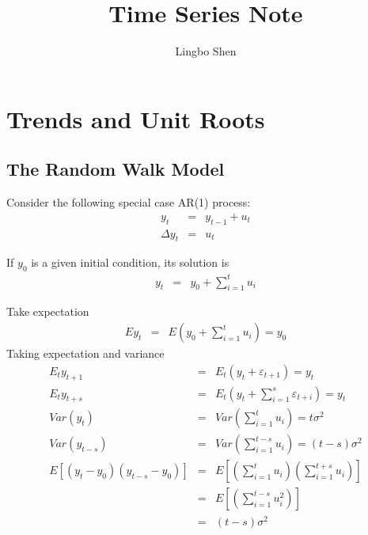 \documentclass{article}
\newcommand*{\MyPath}{./Chapter}
\begin{document}
\title{Time Series Note}
\author{Lingbo Shen}
\maketitle

\tableofcontents
\newpage

















\begin{comment}
\end{comment}



\section[Trends and Unit Roots]{Trends and Unit Roots}
\subsection{The Random Walk Model}
Consider the following special case AR(1) process:
\begin{eqnarray*}
y_{t}&=&y_{t-1}+u_{t}\\
\Delta y_{t}&=&u_{t}
\end{eqnarray*}

If $y_{0}$ is a given initial condition, its solution is
\begin{eqnarray*}
y_{t}&=&y_{0}+\sum_{i=1}^{t}u_{i}
\end{eqnarray*}

Take expectation
\begin{eqnarray*}
Ey_{t}&=& E\left(y_{0}+\sum_{i=1}^{t}u_{i}\right)=y_{0}
\end{eqnarray*}
Taking expectation and variance
\begin{eqnarray*}
E_{t}y_{t+1}&=&E_{t}\left(y_{t}+\varepsilon_{t+1}\right)=y_{t}\\
E_{t}y_{t+s}&=&E_{t}\left(y_{t}+\sum_{i=1}^{s}\varepsilon_{t+i}\right)=y_{t}\\
Var(y_{t})&=&Var\left(\sum_{i=1}^{t}u_{i}\right)=t\sigma^{2}\\
Var(y_{t-s})&=&Var\left(\sum_{i=1}^{t-s}u_{i}\right)=(t-s)\sigma^{2}\\
E\left[(y_{t}-y_{0})(y_{t-s}-y_{0})\right]&=&E\left[(\sum_{i=1}^{t}u_{i} )(\sum_{i=1}^{t+s}u_{i})\right]\\
								&=&E\left[(\sum_{i=1}^{t-s}u_{i}^{2} )\right]\\
								&=&(t-s)\sigma^{2}
\end{eqnarray*}
\end{document}
